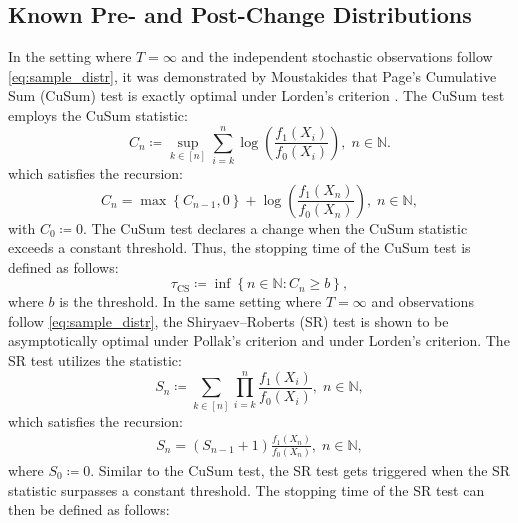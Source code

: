 \documentclass[12pt]{interact}
\newcommand{\lp}{\left(}
\newcommand{\rp}{\right)}
\newcommand{\lb}{\left[}
\newcommand{\rb}{\right]}
\newcommand{\lbp}{\left\{}
\newcommand{\rbp}{\right\}}
\newcommand{\mrm}{\mathrm}
\newcommand{\mbb}{\mathbb}
\theoremstyle{plain}
\begin{document}
\subsection{Known Pre- and Post-Change Distributions}
\label{sec:pre-post-known}

In the setting where $T=\infty$ and the independent stochastic observations follow \eqref{eq:sample_distr}, it was demonstrated by Moustakides \citep{moustakides1986optimal} that Page's Cumulative Sum (CuSum) test \citep{page1954continuous} is exactly optimal under Lorden's criterion \citep{lorden1971procedures}. The CuSum test employs the CuSum statistic:
%
\begin{equation}\label{eq:CuSum_stat}
    C_{n} \coloneqq \sup_{k \in \lb n\rb} \sum_{i = k}^{n} \log \lp \frac{f_{1} \lp X_{i}\rp}{f_{0} \lp X_{i}\rp} \rp,\; n \in \mbb{N}.
\end{equation}
%
which satisfies the recursion:
%
\begin{equation}\label{eq:CuSum_recur}
    C_{n} = \max\lbp C_{n-1}, 0\rbp + \log \lp \frac{f_{1} \lp X_{n}\rp}{f_{0} \lp X_{n}\rp} \rp,\; n \in \mbb{N},
\end{equation}
%
with $C_{0} \coloneqq 0$. The CuSum test declares a change when the CuSum statistic exceeds a constant threshold. Thus, the stopping time of the CuSum test is defined as follows:
%
\begin{equation}\label{eq:CuSum_tau}
    \tau_{\mrm{CS}} \coloneqq \inf\lbp n \in \mbb{N}: C_{n} \geq b \rbp,
\end{equation}
%
where $b$ is the threshold. In the same setting where $T = \infty$ and observations follow \eqref{eq:sample_distr}, the Shiryaev–Roberts (SR) test  \citep{shiryaev1961problem} is shown to be asymptotically optimal under  Pollak's criterion \citep{pollak1985optimal} and under Lorden's criterion. The SR test utilizes the statistic:
%
\begin{equation}\label{eq:SR_stat}
    S_{n} \coloneqq \sum_{k \in \lb n\rb} \prod_{i = k}^{n} \frac{f_{1} \lp X_{i}\rp}{f_{0} \lp X_{i}\rp},\; n \in \mbb{N},
\end{equation}
%
which satisfies the recursion:
%
\begin{align}\label{eq:SR_recur}
    S_{n} = \lp S_{n-1} + 1\rp \frac{f_{1} \lp X_{n}\rp}{f_{0} \lp X_{n}\rp},\; n \in \mbb{N},
\end{align}
%
where $S_{0} \coloneqq 0$. Similar to the CuSum test, the SR test gets triggered when the SR statistic surpasses a constant threshold. The stopping time of the SR test can then be defined as follows:
\end{document}
